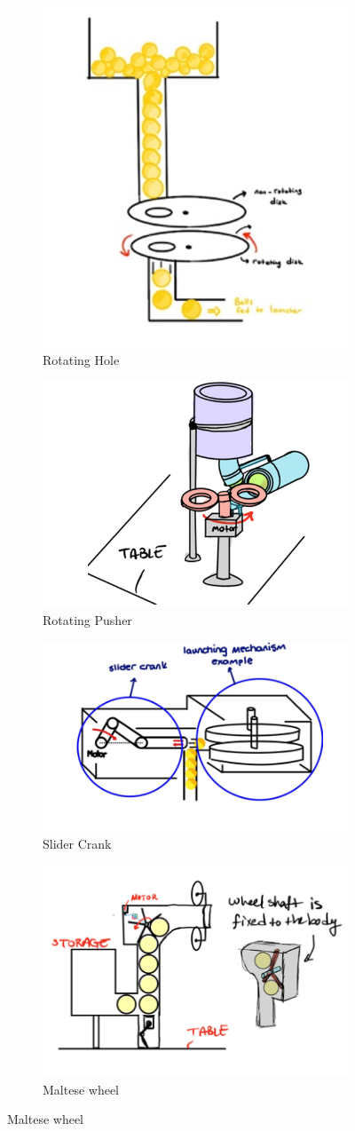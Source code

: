 \documentclass[12pt]{report}
\begin{document}
\begin{appendices}
\begin{figure}[H]
\centering
\begin{subfigure}{.5\textwidth}
  \centering
  \includegraphics[width=.4\linewidth]{Function photos/rotating hole.png}
  \caption{Rotating Hole}
  \label{fig:rotating_hole}
\end{subfigure}%
\begin{subfigure}{.5\textwidth}
  \centering
  \includegraphics[width=.4\linewidth]{Function photos/Rotating Pusher.png}
  \caption{Rotating Pusher}
  \label{fig:rotating_pusher}
\end{subfigure}
\begin{subfigure}{.5\textwidth}
  \centering
  \includegraphics[width=.4\linewidth]{Function photos/Slider Crank.png}
  \caption{Slider Crank}
  \label{fig:slider_crank}
\end{subfigure}%
\begin{subfigure}{.5\textwidth}
  \centering
  \includegraphics[width=.4\linewidth]{Function photos/maltese 2.png}
  \caption{Maltese wheel}
  \label{fig:maltese_wheel}
\end{subfigure}%


\end{figure}
\end{appendices}
\end{document}
